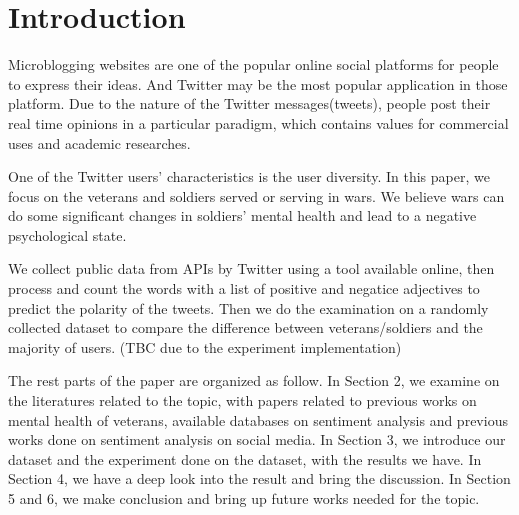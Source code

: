 \section{Introduction}

Microblogging websites are one of the popular online social platforms for people
to express their ideas. And Twitter may be the most popular application in those
platform. Due to the nature of the Twitter messages(tweets), people post their
real time opinions in a particular paradigm, which contains values for
commercial uses and academic researches.

One of the Twitter users' characteristics is the user diversity. In this paper,
we focus on the veterans and soldiers served or serving in wars. We believe wars
can do some significant changes in soldiers' mental health and lead to a negative
psychological state.

We collect public data from APIs by Twitter using a tool available online, then
process and count the words with a list of positive and negatice adjectives to
predict the polarity of the tweets. Then we do the examination on a randomly
collected dataset to compare the difference between veterans/soldiers and the
majority of users.
(TBC due to the experiment implementation)

The rest parts of the paper are organized as follow. In Section 2, we examine on
the literatures related to the topic, with papers related to previous works on
mental health of veterans, available databases on sentiment analysis and
previous works done on sentiment analysis on social media. In Section 3, we
introduce our dataset and the experiment done on the dataset, with the results
we have. In Section 4, we have a deep look into the result and bring the
discussion. In Section 5 and 6, we make conclusion and bring up future works
needed for the topic.
